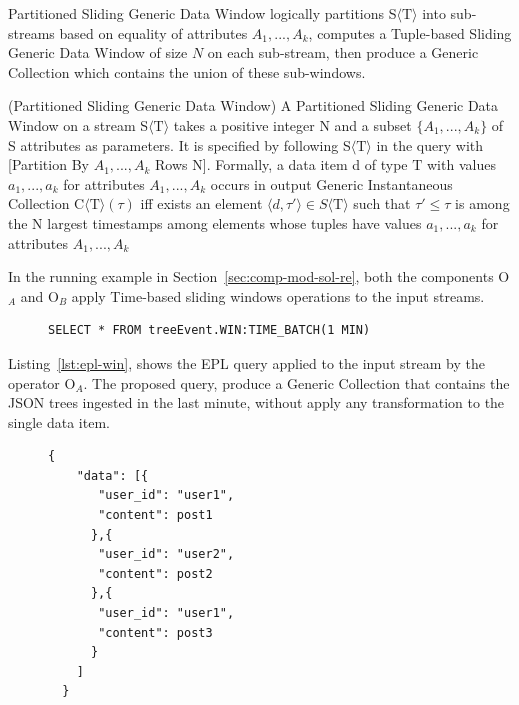 {Partitioned Sliding Generic Data Window logically partitions S$\langle\mathrm{T}\rangle$ into sub-streams based on equality of attributes $A_1, ..., A_k$, computes a Tuple-based Sliding Generic Data Window of size $N$ on each sub-stream, then produce a Generic Collection which contains the union of these sub-windows.

\begin{Definition}
(Partitioned Sliding Generic Data Window) A Partitioned Sliding Generic Data Window on a stream S$\langle\mathrm{T}\rangle$ takes a positive integer N and a subset $\{A_1, ..., A_k\}$ of S attributes as parameters. It is specified by following S$\langle\mathrm{T}\rangle$ in the query with [Partition By $A_1, ..., A_k$ Rows N].
Formally, a data item d of type $\mathrm{T}$ with values $a_1, ..., a_k$ for attributes $A_1, ..., A_k$ occurs in output Generic Instantaneous Collection C$\langle\mathrm{T}\rangle(\tau)$ iff exists an element $\langle d,\tau' \rangle \in S\langle\mathrm{T}\rangle$ such that $\tau' \leq \tau$ is among the N largest timestamps among elements whose tuples have values $a_1, ..., a_k$ for attributes $A_1, ..., A_k$
\end{Definition}

In the running example in Section~\ref{sec:comp-mod-sol-re}, both the components O$_A$ and O$_B$ apply Time-based sliding windows operations to the input streams.

\begin{figure}[ht]
\begin{minipage}{0.95\linewidth}
\begin{lstlisting}[caption={EPL query, applied by O$_A$ operators, to window generic stream},label=lst:epl-win,style=ESPER]
     SELECT * FROM treeEvent.WIN:TIME_BATCH(1 MIN) 
\end{lstlisting}
\end{minipage}
\end{figure}

\medskip

Listing~\ref{lst:epl-win}, shows the EPL query applied to the input stream by the operator O$_A$.
The proposed query, produce a Generic Collection that contains the JSON trees ingested in the last minute, without apply any transformation to the single data item.

\begin{figure}[ht]
\begin{minipage}{0.95\linewidth}
\begin{lstlisting}[caption={Example of result of the O$_A$ operators.},label=lst:oa_res,style=JSON]
  {
    "data": [{
       "user_id": "user1",
       "content": post1
      },{
       "user_id": "user2",
       "content": post2
      },{
       "user_id": "user1",
       "content": post3
      }
    ]
  }
\end{lstlisting}
\end{minipage}
\end{figure}

}
